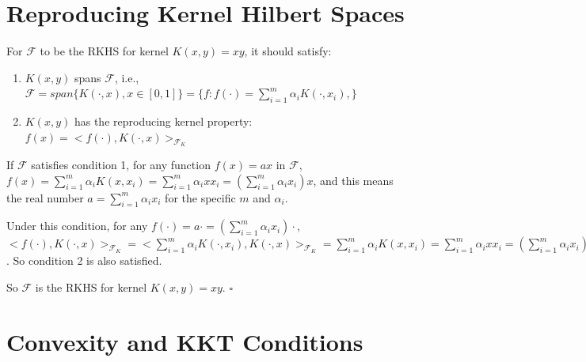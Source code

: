 \documentclass[paper=letter, fontsize=12pt]{article}
\begin{document}
\section{Reproducing Kernel Hilbert Spaces}

For $\mathscr{F}$ to be the RKHS for kernel $K(x,y)=xy$, it should satisfy:

\begin{enumerate}
	\item $K(x,y)$ spans $\mathscr{F}$, i.e., $\mathscr{F} = span\{ K(\cdot, x), x \in [0, 1] \} = \{f: f(\cdot) = \sum_{i = 1}^{m} \alpha_i K(\cdot, x_i), \}$
	
	\item $K(x, y)$ has the reproducing kernel property: $f(x) = <f(\cdot), K(\cdot, x)>_{\mathscr{F}_K}$
\end{enumerate}

 If $\mathscr{F}$ satisfies condition 1, for any function $f(x) = ax$ in $\mathscr{F}$, $f(x) = \sum_{i = 1}^m \alpha_i K(x, x_i)  = \sum_{i = 1}^m \alpha_i x x_i = (\sum_{i = 1}^m \alpha_i x_i ) x$, and this means the real number $a = \sum_{i = 1}^m \alpha_i x_i $ for the specific $m$ and $\alpha_i$.

 Under this condition, for any $f(\cdot) = a\cdot = (\sum_{i = 1}^m \alpha_i x_i) \cdot$, $<f(\cdot), K(\cdot, x)>_{\mathscr{F}_K} = <\sum_{i = 1}^m \alpha_i K(\cdot, x_i), K(\cdot, x)>_{\mathscr{F}_K} = \sum_{i = 1}^m \alpha_i K(x, x_i) = \sum_{i = 1}^m \alpha_i x x_i = (\sum_{i = 1}^m \alpha_i x_i) x = ax = f(x)$. So condition 2 is also satisfied.

So $\mathscr{F}$ is the RKHS for  kernel $K(x,y)=xy$. $\square$

\section{Convexity and KKT Conditions}
\end{document}

